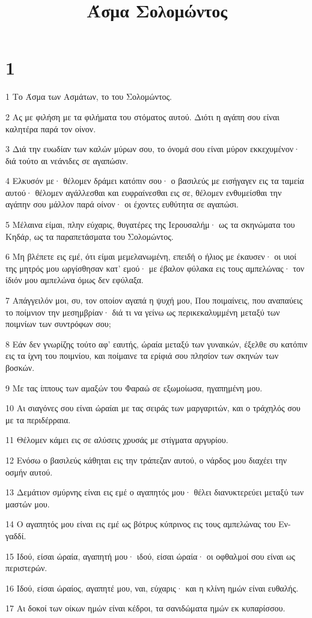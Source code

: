 

\title{Άσμα Σολομώντος}


\chapter{1}

\par 1 Το Άσμα των Ασμάτων, το του Σολομώντος.
\par 2 Ας με φιλήση με τα φιλήματα του στόματος αυτού. Διότι η αγάπη σου είναι καλητέρα παρά τον οίνον.
\par 3 Διά την ευωδίαν των καλών μύρων σου, το όνομά σου είναι μύρον εκκεχυμένον· διά τούτο αι νεάνιδες σε αγαπώσιν.
\par 4 Ελκυσόν με· θέλομεν δράμει κατόπιν σου· ο βασιλεύς με εισήγαγεν εις τα ταμεία αυτού· θέλομεν αγάλλεσθαι και ευφραίνεσθαι εις σε, θέλομεν ενθυμείσθαι την αγάπην σου μάλλον παρά οίνον· οι έχοντες ευθύτητα σε αγαπώσι.
\par 5 Μέλαινα είμαι, πλην εύχαρις, θυγατέρες της Ιερουσαλήμ· ως τα σκηνώματα του Κηδάρ, ως τα παραπετάσματα του Σολομώντος.
\par 6 Μη βλέπετε εις εμέ, ότι είμαι μεμελανωμένη, επειδή ο ήλιος με έκαυσεν· οι υιοί της μητρός μου ωργίσθησαν κατ' εμού· με έβαλον φύλακα εις τους αμπελώνας· τον ίδιόν μου αμπελώνα όμως δεν εφύλαξα.
\par 7 Απάγγειλόν μοι, συ, τον οποίον αγαπά η ψυχή μου, Που ποιμαίνεις, που αναπαύεις το ποίμνιον την μεσημβρίαν· διά τι να γείνω ως περικεκαλυμμένη μεταξύ των ποιμνίων των συντρόφων σου;
\par 8 Εάν δεν γνωρίζης τούτο αφ' εαυτής, ώραία μεταξύ των γυναικών, έξελθε συ κατόπιν εις τα ίχνη του ποιμνίου, και ποίμαινε τα ερίφιά σου πλησίον των σκηνών των βοσκών.
\par 9 Με τας ίππους των αμαξών του Φαραώ σε εξωμοίωσα, ηγαπημένη μου.
\par 10 Αι σιαγόνες σου είναι ώραίαι με τας σειράς των μαργαριτών, και ο τράχηλός σου με τα περιδέρραια.
\par 11 Θέλομεν κάμει εις σε αλύσεις χρυσάς με στίγματα αργυρίου.
\par 12 Ενόσω ο βασιλεύς κάθηται εις την τράπεζαν αυτού, ο νάρδος μου διαχέει την οσμήν αυτού.
\par 13 Δεμάτιον σμύρνης είναι εις εμέ ο αγαπητός μου· θέλει διανυκτερεύει μεταξύ των μαστών μου.
\par 14 Ο αγαπητός μου είναι εις εμέ ως βότρυς κύπρινος εις τους αμπελώνας του Εν-γαδδί.
\par 15 Ιδού, είσαι ώραία, αγαπητή μου· ιδού, είσαι ώραία· οι οφθαλμοί σου είναι ως περιστερών.
\par 16 Ιδού, είσαι ώραίος, αγαπητέ μου, ναι, εύχαρις· και η κλίνη ημών είναι ευθαλής.
\par 17 Αι δοκοί των οίκων ημών είναι κέδροι, τα σανιδώματα ημών εκ κυπαρίσσου.


